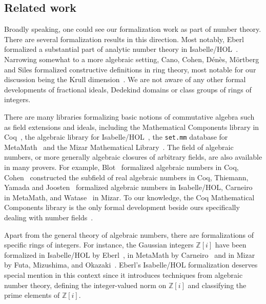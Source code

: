 \documentclass[sn-mathphys]{sn-jnl}%
\renewcommand{\Z}{\mathbb{Z}}
\begin{document}
\subsection{Related work}

Broadly speaking, one could see our formalization work as part of number theory. There are several formalization results in this direction.
Most notably, Eberl formalized a substantial part of analytic number theory in Isabelle/HOL~\cite{Eberl19}.
Narrowing somewhat to a more algebraic setting,
Cano, Cohen, Dénès, Mörtberg and Siles formalized constructive definitions in ring theory, most notable for our discussion being the Krull dimension~\cite{linear-algebra-coq}.
We are not aware of any other formal developments of fractional ideals, Dedekind domains or class groups of rings of integers.

There are many libraries formalizing basic notions of commutative algebra such as field extensions and ideals, including the Mathematical Components library in Coq~\cite{mathcomp},
the algebraic library for Isabelle/HOL~\cite{algebra_isabelle},
the \texttt{set.mm} database for MetaMath~\cite{metamath} and the Mizar Mathematical Library~\cite{algebraic-hierarchy_mizar}.
The field of algebraic numbers, or more generally algebraic closures of arbitrary fields, are also available in many provers.
For example, Blot~\cite{algebraic-numbers-ccorn} formalized algebraic numbers in Coq,
Cohen~\cite{real-algebraic-numbers-coq} constructed the subfield of real algebraic numbers in Coq,
Thiemann, Yamada and Joosten~\cite{algebraic-numbers-isabelle} formalized algebraic numbers in Isabelle/HOL,
Carneiro~\cite{algebraic-numbers-metamath} in MetaMath,
and Watase~\cite{algebraic-numbers-mizar} in Mizar.
To our knowledge, the Coq Mathematical Components library is the only formal development beside ours specifically dealing with number fields~\cite[\texttt{field/algnum.v}]{mathcomp}.

Apart from the general theory of algebraic numbers, there are formalizations of specific rings of integers.
For instance, the Gaussian integers $\Z[i]$ have been formalized
in Isabelle/HOL by Eberl~\cite{gaussian_integers-isabelle},
in MetaMath by Carneiro~\cite{gaussian_integers-metamath}
and in Mizar by Futa, Mizushima, and Okazaki~\cite{gaussian_integers-mizar}.
Eberl's Isabelle/HOL formalization deserves special mention in this context since it introduces techniques from algebraic number theory,
defining the integer-valued norm on $\Z[i]$ and classifying the prime elements of $\Z[i]$.
\end{document}
